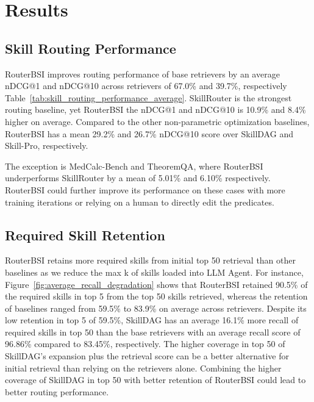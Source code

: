 

\section{Results}

\subsection{Skill Routing Performance}

RouterBSI improves routing performance of base retrievers by an average nDCG@1 and nDCG@10 across retrievers of 67.0\% and 39.7\%, respectively Table~\ref{tab:skill_routing_performance_average}. SkillRouter is the strongest routing baseline, yet RouterBSI the nDCG@1 and nDCG@10 is 10.9\% and 8.4\% higher on average. Compared to the other non-parametric optimization baselines, RouterBSI has a mean 29.2\% and 26.7\% nDCG@10 score over SkillDAG and Skill-Pro, respectively.

The exception is MedCalc-Bench and TheoremQA, where RouterBSI underperforms SkillRouter by a mean of 5.01\% and 6.10\% respectively. RouterBSI could further improve its performance on these cases with more training iterations or relying on a human to directly edit the predicates.

\subsection{Required Skill Retention}

RouterBSI retains more required skills from initial top 50 retrieval than other baselines as we reduce the max k of skills loaded into LLM Agent. For instance, Figure~\ref{fig:average_recall_degradation} shows that RouterBSI retained 90.5\% of the required skills in top 5 from the top 50 skills retrieved, whereas the retention of baselines ranged from 59.5\% to 83.9\% on average across retrievers. Despite its low retention in top 5 of 59.5\%, SkillDAG has an average  16.1\% more recall of required skills in top 50 than the base retrievers with an average recall score of 96.86\% compared to 83.45\%, respectively. The higher coverage in top 50 of SkillDAG’s expansion plus the retrieval score can be a better alternative for initial retrieval than relying on the retrievers alone. Combining the higher coverage of SkillDAG in top 50 with better retention of RouterBSI could lead to better routing performance.

